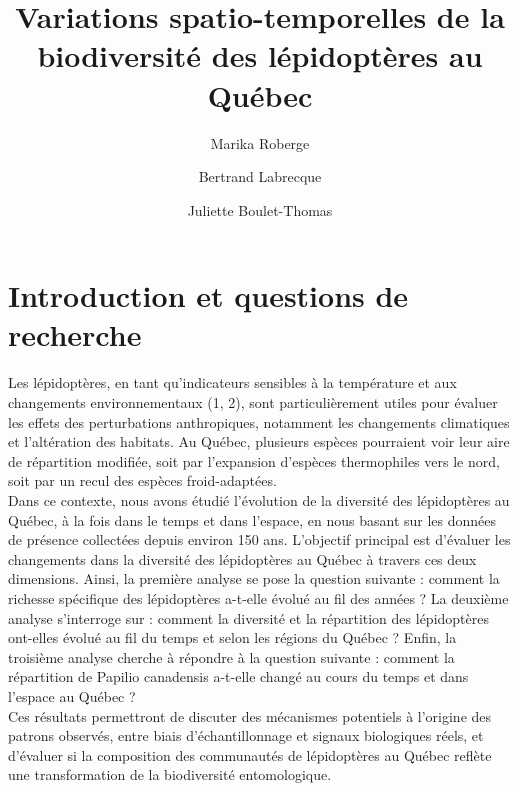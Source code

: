 \documentclass[9pt,twocolumn,twoside,]{pnas-new}
\title{Variations spatio-temporelles de la biodiversité des lépidoptères
au Québec}
\author[a]{Marika Roberge}
\author[a]{Bertrand Labrecque}
\author[a]{Juliette Boulet-Thomas}
\affil[a]{Faculté des sciences, Département de biologie, 2500
Boulevard de l'Université, Sherbrooke, Québec, J1K 2R1}
\begin{document}
\verticaladjustment{-2pt}



\maketitle
\thispagestyle{firststyle}


\acknow{}

\section{Introduction et questions de
recherche}\label{introduction-et-questions-de-recherche}

Les lépidoptères, en tant qu'indicateurs sensibles à la température et
aux changements environnementaux (1, 2), sont particulièrement utiles
pour évaluer les effets des perturbations anthropiques, notamment les
changements climatiques et l'altération des habitats. Au Québec,
plusieurs espèces pourraient voir leur aire de répartition modifiée,
soit par l'expansion d'espèces thermophiles vers le nord, soit par un
recul des espèces froid-adaptées.\\
Dans ce contexte, nous avons étudié l'évolution de la diversité des
lépidoptères au Québec, à la fois dans le temps et dans l'espace, en
nous basant sur les données de présence collectées depuis environ 150
ans. L'objectif principal est d'évaluer les changements dans la
diversité des lépidoptères au Québec à travers ces deux dimensions.
Ainsi, la première analyse se pose la question suivante : comment la
richesse spécifique des lépidoptères a-t-elle évolué au fil des années ?
La deuxième analyse s'interroge sur : comment la diversité et la
répartition des lépidoptères ont-elles évolué au fil du temps et selon
les régions du Québec ? Enfin, la troisième analyse cherche à répondre à
la question suivante : comment la répartition de Papilio canadensis
a-t-elle changé au cours du temps et dans l'espace au Québec ?\\
Ces résultats permettront de discuter des mécanismes potentiels à
l'origine des patrons observés, entre biais d'échantillonnage et signaux
biologiques réels, et d'évaluer si la composition des communautés de
lépidoptères au Québec reflète une transformation de la biodiversité
entomologique.
\end{document}
